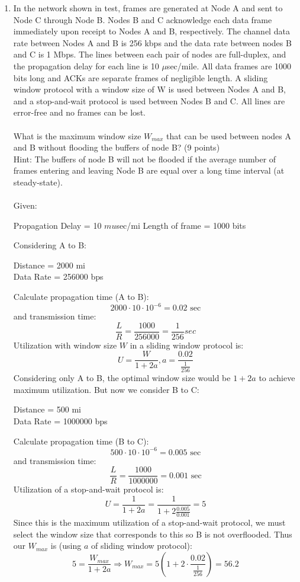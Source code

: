 \documentclass[12pt]{article}
\begin{document}
\begin{enumerate}
\item In the network shown in test, frames are generated at Node A and sent to Node C through Node B.  Nodes B and C acknowledge each data frame immediately upon receipt to Nodes A and B, respectively.  The channel data rate between Nodes A and B is 256 kbps and the data rate between nodes B and C is 1 Mbps. The lines between each pair of nodes are full-duplex, and the propagation delay for each line is 10 $\mu$sec/mile.  All data frames are 1000 bits long and ACKs are separate frames of negligible length.  A sliding window protocol with a window size of W is used between Nodes A and B, and a stop-and-wait protocol is used between Nodes B and C.  All lines are error-free and no frames can be lost. \\ \\
What is the maximum window size $W_{max}$ that can be used between nodes A and B without flooding the buffers of node B?  (9 points) \\ 
Hint:  The buffers of node B will not be flooded if the average number of frames entering and leaving Node B are equal over a long time interval (at steady-state). \\ \\
Given:
\begin{center}
  Propagation Delay = 10 $mu$sec/mi
  Length of frame = 1000 bits
\end{center}
  Considering A to B:
  \begin{center}
    Distance = 2000 mi \\
    Data Rate = 256000 bps
  \end{center}
  Calculate propagation time (A to B):
  \[ 2000 \cdot 10 \cdot 10^{-6} = 0.02 \text{ sec} \]
  and transmission time:
  \[ \frac{L}{R} = \frac{1000}{256000} = \frac{1}{256} sec \]
  Utilization with window size $W$ in a sliding window protocol is:
  \[ U = \frac{W}{1+2a}, a = \frac{0.02}{\frac{1}{256}} \]
  Considering only A to B, the optimal window size would be $1+2a$ to achieve maximum utilization. But now we consider B to C:
  \begin{center}
    Distance = 500 mi \\
    Data Rate = 1000000 bps 
  \end{center}
  Calculate propagation time (B to C):
  \[ 500 \cdot 10 \cdot 10^{-6} = 0.005 \text{ sec}\]
  and transmission time:
  \[ \frac{L}{R} = \frac{1000}{1000000} = 0.001 \text{ sec} \]
  Utilization of a stop-and-wait protocol is:
  \[ U = \frac{1}{1+2a} = \frac{1}{1+2\frac{0.005}{0.001}} = 5 \]
  Since this is the maximum utilization of a stop-and-wait protocol, we must select the window size that corresponds to this so B is not overflooded. Thus our $W_{max}$ is (using $a$ of sliding window protocol):
  \[ 5 = \frac{W_{max}}{1+2a} \Rightarrow W_{max} = 5\left(1+2\cdot\frac{0.02}{\frac{1}{256}}\right) = 56.2 \]
  



\end{enumerate}
\end{document}
